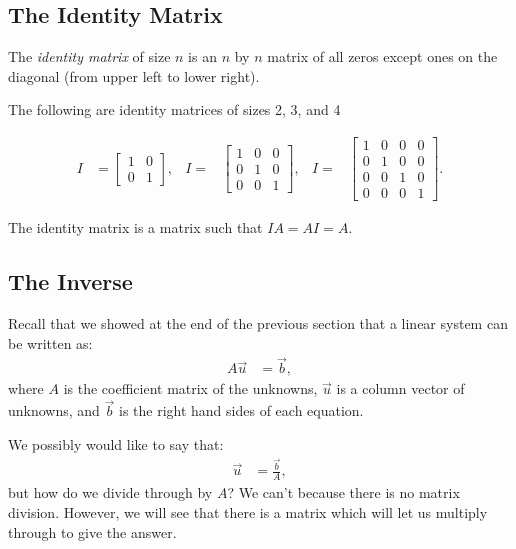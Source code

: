 \subsection{The Identity Matrix} 

\begin{definition}
The \emph{identity matrix} of size $n$ is an $n$ by $n$ matrix of all zeros except ones on the diagonal (from upper left to lower right).
\end{definition}


  The following are identity matrices of sizes 2, 3, and 4

\begin{align*}
I & =\begin{bmatrix}
1 & 0 \\ 0 & 1
\end{bmatrix},
&I =&
\begin{bmatrix}
1 & 0 & 0 \\ 0 & 1 & 0 \\ 0 & 0 & 1
\end{bmatrix},
&I = &
\begin{bmatrix}
1 & 0 & 0 & 0\\ 0 & 1 & 0 & 0 \\ 0 & 0 & 1 & 0 \\ 0 & 0 & 0 & 1
\end{bmatrix}.
\end{align*}

The identity matrix is a matrix such that $IA = AI = A$.   

\subsection{The Inverse}

Recall that we showed at the end of the previous section that a linear system can be written as:
%
\begin{align*}
A \vec{u} & = \vec{b},
\end{align*}
%
where $A$ is the coefficient matrix of the unknowns, $\vec{u}$ is a column vector of unknowns, and $\vec{b}$ is the right hand sides of each equation. 

We possibly would like to say that:
%
\begin{align*}
\vec{u} & = \frac{\vec{b}}{A},
\end{align*}
but how do we divide through by $A$?  We can't because there is no matrix division.   However, we will see that there is a matrix which will let us multiply through to give the answer.  

